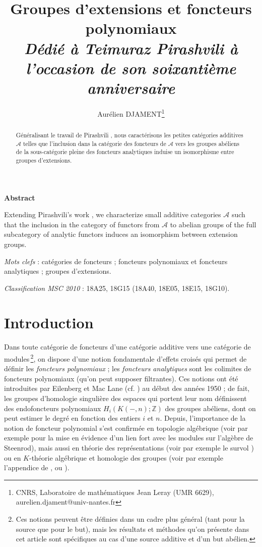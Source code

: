 \documentclass[a4paper,10pt]{article}
\title{Groupes d'extensions et foncteurs polynomiaux\\
{\em {\large D\'edi\'e \`a Teimuraz Pirashvili \`a l'occasion de son soixanti\`eme anniversaire}}}
\author{Aur\'elien DJAMENT\thanks{CNRS, Laboratoire de mathématiques Jean Leray (UMR 6629), aurelien.djament@univ-nantes.fr}}
\newcommand{\A}{{\mathcal{A}}}
\theoremstyle{definition}
\theoremstyle{remark}
\begin{document}
\maketitle

\begin{abstract}
Généralisant le travail de Pirashvili \cite{P-extor}, nous caractérisons les petites catégories additives $\A$ telles que l'inclusion dans la catégorie des foncteurs de $\A$ vers les groupes abéliens de la sous-catégorie pleine des foncteurs analytiques induise un isomorphisme entre groupes d'extensions.
\end{abstract}

\begin{small}
\begin{center}
 \textbf{Abstract}

\smallskip

Extending Pirashvili's work \cite{P-extor}, we characterize small additive categories $\A$ such that the inclusion in the category of functors from $\A$ to abelian groups of the full subcategory of analytic functors induces an isomorphism between extension groups. 
\end{center}
\end{small}

\medskip

\noindent
{\em Mots clefs} : catégories de foncteurs ; foncteurs polynomiaux et foncteurs analytiques ; groupes d'extensions.

\smallskip

\noindent
{\em Classification MSC 2010} : 18A25, 18G15 (18A40, 18E05, 18E15, 18G10).





\section*{Introduction}

Dans toute catégorie de foncteurs d'une catégorie additive vers une catégorie de modules\,\footnote{Ces notions peuvent être définies dans un cadre plus général (tant pour la source que pour le but), mais les résultats et méthodes qu'on présente dans cet article sont spécifiques au cas d'une source additive et d'un but abélien.}, on dispose d'une notion fondamentale d'effets croisés qui permet de définir les {\em foncteurs polynomiaux} ; les {\em foncteurs analytiques} sont les colimites de foncteurs polynomiaux (qu'on peut supposer filtrantes). Ces notions ont été introduites par Eilenberg et Mac Lane (cf. \cite{EML}) au début des années 1950 ; de fait, les groupes d'homologie singulière des espaces qui portent leur nom définissent des endofoncteurs polynomiaux $H_i(K(-,n);\mathbb{Z})$ des groupes abéliens, dont on peut estimer le degré en fonction des entiers $i$ et $n$. Depuis, l'importance de la notion de foncteur polynomial s'est confirmée en topologie algébrique (voir par exemple \cite{HLS} pour la mise en évidence d'un lien fort avec les modules sur l'algèbre de Steenrod), mais aussi en théorie des représentations (voir par exemple le survol \cite{Ku}) ou en $K$-théorie algébrique et homologie des groupes (voir par exemple l'appendice de \cite{FFSS}, ou \cite{Dja-JKT}).
\end{document}
